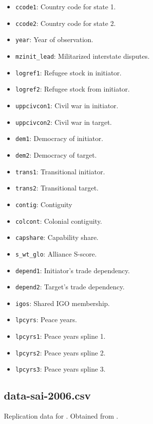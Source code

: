 \documentclass[12pt]{article}
\begin{document}
\begin{itemize}
  \item \texttt{ccode1}: Country code for state 1.
  \item \texttt{ccode2}: Country code for state 2.
  \item \texttt{year}: Year of observation.
  \item \texttt{mzinit\_lead}: Militarized interstate disputes.
  \item \texttt{logref1}: Refugee stock in initiator.
  \item \texttt{logref2}: Refugee stock from initiator.
  \item \texttt{uppcivcon1}: Civil war in initiator.
  \item \texttt{uppcivcon2}: Civil war in target.
  \item \texttt{dem1}: Democracy of initiator.
  \item \texttt{dem2}: Democracy of target.
  \item \texttt{trans1}: Transitional initiator.
  \item \texttt{trans2}: Transitional target.
  \item \texttt{contig}: Contiguity
  \item \texttt{colcont}: Colonial contiguity.
  \item \texttt{capshare}: Capability share.
  \item \texttt{s\_wt\_glo}: Alliance S-score.
  \item \texttt{depend1}: Initiator's trade dependency.
  \item \texttt{depend2}: Target's trade dependency.
  \item \texttt{igos}: Shared IGO membership.
  \item \texttt{lpcyrs}: Peace years.
  \item \texttt{lpcyrs1}: Peace years spline 1.
  \item \texttt{lpcyrs2}: Peace years spline 2.
  \item \texttt{lpcyrs3}: Peace years spline 3.
\end{itemize}


\subsection{data-sai-2006.csv}

Replication data for \citet{Sobek:2006cn}.
Obtained from \citet{sobek2006data}.
\end{document}
